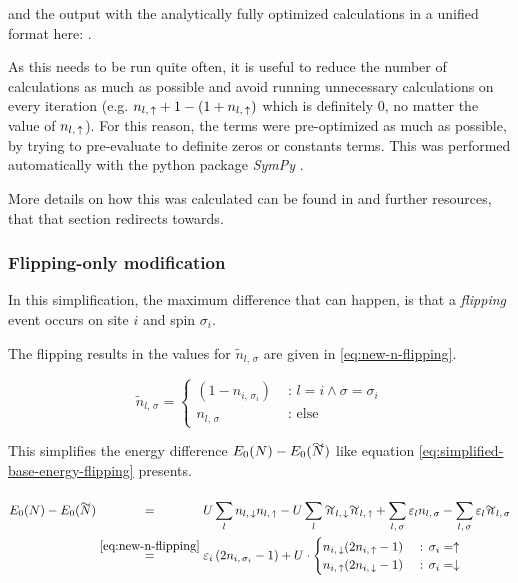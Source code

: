 
and the output with the analytically fully optimized calculations in a unified format here:
.

As this needs to be run quite often, it is useful to reduce the number of calculations as much as possible and avoid running unnecessary calculations on every iteration (e.g. $n_{l,\,\uparrow} + 1 - (1 + n_{l,\,\uparrow})$ which is definitely 0, no matter the value of $n_{l,\,\uparrow}$).
For this reason, the terms were pre-optimized as much as possible, by trying to pre-evaluate to definite zeros or constants terms. 
This was performed automatically with the python package \emph{SymPy} \cite{sympyPackage}.

More details on how this was calculated can be found in  and further resources, that that section redirects towards.

\subsubsection*{Flipping-only modification}

In this simplification, the maximum difference that can happen, is that a \emph{flipping} event occurs on site $i$ and spin $\sigma_i$. 

The flipping results in the values for $\tilde{n}_{l,\,\sigma}$ are given in \autoref{eq:new-n-flipping}.

\begin{equation}
    \label{eq:new-n-flipping}
    \tilde{n}_{l,\,\sigma} = \begin{cases}
        (1 - n_{i,\,\sigma_i})&\text{ : } l = i \land \sigma = \sigma_i   \\
        n_{l,\,\sigma} &\text{ : else}
    \end{cases}
\end{equation}

This simplifies the energy difference $E_0(N)-E_0(\vphantom{N}\smash{\tilde{N}})$ like equation \autoref{eq:simplified-base-energy-flipping} presents.

\begin{equation}
    \label{eq:simplified-base-energy-flipping}
    \begin{split}
        E_0(N)-E_0(\vphantom{N}\smash{\tilde{N}}) 
        &\stackrel{\phantom{\ref{eq:new-n-flipping}}}{=} U\lsum n_{l,\,\down}n_{l,\,\up}-U\lsum \tilde{n}_{l,\,\down}\tilde{n}_{l,\,\up} 
        + \lsum[l,\,\sigma] \epsl n_{l,\,\sigma} - \lsum[l,\,\sigma] \epsl \tilde{n}_{l,\,\sigma}\\
        &\stackrel{\ref{eq:new-n-flipping}}{=} \epsl[i] \left(2 n_{i,\,\sigma_i} - 1\right) +
        U\cdot \begin{cases}
            n_{i,\,\down} (2 n_{i,\,\up} - 1) &\text{ : } \sigma_i = \up   \\
            n_{i,\,\up} (2 n_{i,\,\down} - 1) &\text{ : } \sigma_i = \down 
        \end{cases}
    \end{split}
\end{equation}

